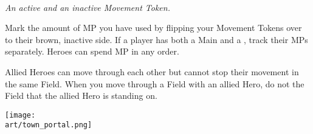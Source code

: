 \begin{multicols}{2}
\begin{center}
  \\
  \medskip
  \footnotesize\textit{An active and an inactive Movement Token.}
\end{center}

\bigskip

Mark the amount of MP you have used by flipping your Movement Tokens over to their brown, inactive side.
If a player has both a Main and a , track their MPs separately.
Heroes can spend MP in any order.\par
Allied Heroes can move through each other but cannot stop their movement in the same Field.
When you move through a Field with an allied Hero, do not  the Field that the allied Hero is standing on.\par


\vfill
\begin{center}
  \texttt{[image: \\art/town\_portal.png]}
\end{center}

\clearpage


\end{multicols}
